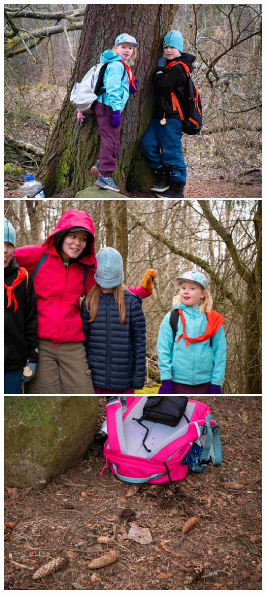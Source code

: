 \begin{multicols}{2}
	\noindent\includegraphics[width=0.9\linewidth]{assets/kolkkienpäiväretki7}
	\noindent\includegraphics[width=0.9\linewidth]{assets/kolkkienpäiväretki9}
	\noindent\includegraphics[width=0.9\linewidth]{assets/kolkkienpäiväretki10}

\end{multicols}
